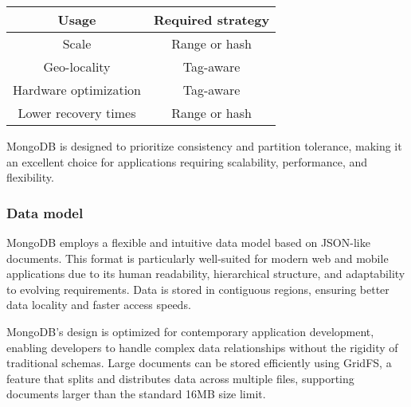 \begin{table}[H]
    \centering
    \begin{tabular}{|c|c|}
        \hline
        \textbf{Usage} & \textbf{Required strategy} \\ \hline
        Scale & Range or hash \\ \hline
        Geo-locality & Tag-aware \\ \hline
        Hardware optimization & Tag-aware \\ \hline
        Lower recovery times & Range or hash \\ \hline
    \end{tabular}
\end{table}
MongoDB is designed to prioritize consistency and partition tolerance, making it an excellent choice for applications requiring scalability, performance, and flexibility.

\subsubsection{Data model}
MongoDB employs a flexible and intuitive data model based on JSON-like documents. 
This format is particularly well-suited for modern web and mobile applications due to its human readability, hierarchical structure, and adaptability to evolving requirements. 
Data is stored in contiguous regions, ensuring better data locality and faster access speeds.

MongoDB's design is optimized for contemporary application development, enabling developers to handle complex data relationships without the rigidity of traditional schemas. 
Large documents can be stored efficiently using GridFS, a feature that splits and distributes data across multiple files, supporting documents larger than the standard 16MB size limit.

